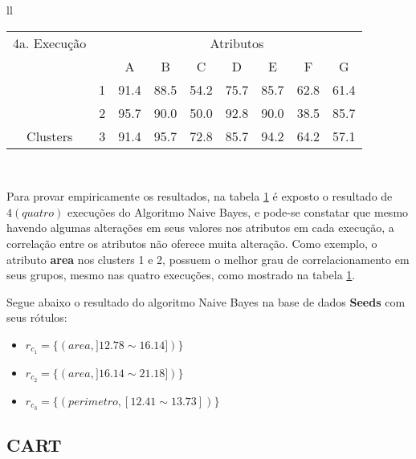 \begin{table}[!h]
\begin{tabular}{ll}
       \small\addtolength{\tabcolsep}{-5pt}
   \begin{tabular}{|cl|c|c|c|c|c|c|c|}
        \hline \hline
            {\tiny 4a. Execução }   &   & \multicolumn{7}{c|}{Atributos}                                               \\ \cline{3-9} 
       \multicolumn{1}{|l}{}                            &   & A    & B & C & D & E & F & G \\ \hline
        \multicolumn{1}{|c|}{}                           & 1 & 91.4 & 88.5   & 54.2      & 75.7 & 85.7 & 62.8   & 61.4   \\ \cline{2-9} 
        \multicolumn{1}{|c|}{}                           & 2 & 95.7 & 90.0   & 50.0      & 92.8 & 90.0 & 38.5  & 85.7  \\ \cline{2-9} 
        \multicolumn{1}{|c|}{\multirow{-3}{*}{Clusters}} & 3 & 91.4 & 95.7   & 72.8      & 85.7 & 94.2 & 64.2  & 57.1  \\ \hline
   \end{tabular}
   \\
 
 \end{tabular}
 \label{tab:execucoes:seed:nb}
\end{table}

Para provar empiricamente os resultados, na tabela \ref{tab:execucoes:seed:nb} é exposto o resultado de ${4(quatro)}$ execuções do Algoritmo Naive Bayes, e pode-se constatar que mesmo havendo algumas alterações em seus valores nos atributos em cada execução, a correlação entre os atributos não oferece muita alteração. Como exemplo, o atributo \textbf{area} nos clusters 1 e 2, possuem o melhor grau de correlacionamento em seus grupos, mesmo nas quatro execuções, como mostrado na tabela \ref{tab:execucoes:seed:nb}.

Segue abaixo o resultado do algoritmo Naive Bayes na base de dados \textbf{Seeds} com seus rótulos: 
\begin{itemize}[noitemsep]
 \item ${r_{c_1}=\{ (area, ]12.78 \sim 16.14]) \} }$  
 \item ${r_{c_2}=\{ (area, ]16.14 \sim 21.18]) \} }$
 \item ${r_{c_3}=\{ (perimetro, [12.41 \sim 13.73])\} }$
\end{itemize}


\subsection{CART}\label{cap:resultados:ssec:seed:cart}


